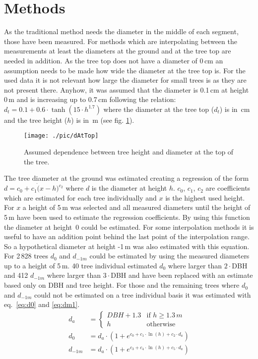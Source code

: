 \documentclass[twocolumn]{scrartcl}
\begin{document}
\section{Methods}

As the traditional method needs the diameter in the middle of each segment,
those have been measured. For methods which are interpolating between the
measurements at least the diameters at the ground and at the tree top are needed
in addition. As the tree top does not have a diameter of 0\,cm an assumption
needs to be made how wide the diameter at the tree top is. For the used data it
is not relevant how large the diameter for small trees is as they are not
present there. Anyhow, it was assumed that the diameter is 0.1\,cm at height
0\,m and is increasing up to 0.7\,cm following the relation: $d_t = 0.1 + 0.6
\cdot \tanh(15 \cdot h^{1.7})$ where the diameter at the tree top ($d_t$) is
in~cm and the tree height ($h$) is in~m (see fig. \ref{fig:dAtTop}).

\begin{figure}[htbp]
  \centering
  \texttt{[image: ./pic/dAtTop]}
  \caption{Assumed dependence between tree height and diameter at the top of the tree.}
  \label{fig:dAtTop}
\end{figure}

The tree diameter at the ground was estimated creating a regression of the form
$d = c_0 + c_1 \dot (x - h)^{c_2}$ where $d$ is the diameter at height $h$.
$c_0$, $c_1$, $c_2$ are coefficients which are estimated for each tree
individually and $x$ is the highest used height. For $x$ a height of 5\,m was
selected and all measured diameters until the height of 5\,m have been used to
estimate the regression coefficients. By using this function the diameter at
height~0 could be estimated. For some interpolation methods it is useful to have
an addition point behind the last point of the interpolation range. So a
hypothetical diameter at height -1\,m was also estimated with this equation. For
2\,828 trees $d_0$ and $d_{-1m}$ could be estimated by using the measured
diameters up to a height of 5\,m. 40 tree individual estimated $d_0$ where
larger than $2\cdot$DBH and 412 $d_{-1m}$ where larger than $3\cdot$DBH and have
been replaced with an estimate based only on DBH and tree height. For those and
the remaining trees where $d_0$ and $d_{-1m}$ could not be estimated on a tree
individual basis it was estimated with eq.~\ref{eq:d0} and \ref{eq:dm1}.
\begin{align}
  d_{a} & = \begin{cases}
    DBH + 1.3 & \text{if } h \geq 1.3\,m\\
    h         & \text{otherwise}
\end{cases}\\
\label{eq:d0}
d_0 & = d_{a} \cdot (1 + e^{c_0 + c_1\cdot \ln(h) + c_2\cdot d_{a}})\\
\label{eq:dm1}
d_{-1m} & = d_{a} \cdot (1 + e^{c_3 + c_4\cdot \ln(h) + c_5\cdot d_{a}})
\end{align}
\end{document}
